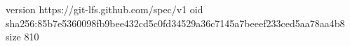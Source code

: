 version https://git-lfs.github.com/spec/v1
oid sha256:85b7e5360098fb9bee432cd5c0fd34529a36c7145a7beeef233ced5aa78aa4b8
size 810
